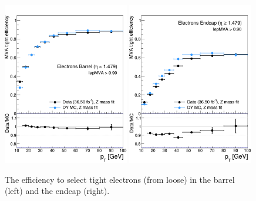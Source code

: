 \begin{figure}[hbtp]
 \begin{center}
   \includegraphics[width=0.49\textwidth]{ch4_figs/tnp_eff_eb_2lss_pt.pdf}
   \includegraphics[width=0.49\textwidth]{ch4_figs/tnp_eff_ee_2lss_pt.pdf}
   \caption[Tight electron efficiencies in barrel and endcap]{The efficiency to select tight electrons (from loose) in the barrel (left) and the endcap (right).}
   \label{fig:ele_eff}
   \end{center}
\end{figure}

